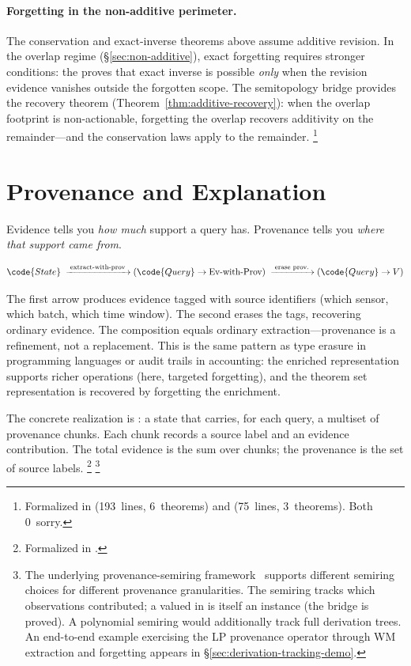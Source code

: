 \documentclass[11pt,openany]{report}
\begin{document}
\paragraph{Forgetting in the non-additive perimeter.}
The conservation and exact-inverse theorems above assume additive
revision.  In the overlap regime
(\S\ref{sec:non-additive}), exact forgetting requires stronger
conditions: the  proves that
exact inverse is possible \emph{only} when the revision evidence
vanishes outside the forgotten scope.  The semitopology bridge
provides the recovery theorem
(Theorem~\ref{thm:additive-recovery}): when the overlap footprint
is non-actionable, forgetting the overlap recovers additivity on
the remainder---and the conservation laws apply to the
remainder.%
\footnote{Formalized in
(193~lines, 6~theorems) and
(75~lines, 3~theorems).  Both 0~sorry.}


\section{Provenance and Explanation}
\label{sec:provenance}

Evidence tells you \emph{how much} support a query has.  Provenance
tells you \emph{where that support came from}.

\[
  \code{State}
  \;\xrightarrow{\;\text{extract-with-prov}\;}
  (\code{Query} \to \text{Ev-with-Prov})
  \;\xrightarrow{\;\text{erase prov.}\;}
  (\code{Query} \to V)
\]

\noindent
The first arrow produces evidence tagged with source identifiers
(which sensor, which batch, which time window).  The second erases
the tags, recovering ordinary evidence.  The composition equals
ordinary extraction---provenance is a refinement, not a replacement.
This is the same pattern as type erasure in programming languages or
audit trails in accounting: the enriched representation supports
richer operations (here, targeted forgetting), and the theorem set
representation is recovered by forgetting the enrichment.

The concrete realization is : a state that
carries, for each query, a multiset of provenance chunks.  Each chunk
records a source label and an evidence contribution.  The total
evidence is the sum over chunks; the provenance is the set of source
labels.%
\footnote{Formalized in
.}%
\footnote{The underlying provenance-semiring
framework~\cite{GreenKarvounarakisTannen2007} supports different
semiring choices for different provenance granularities.  The
 semiring tracks which observations contributed; a
 valued in  is itself an
 instance (the bridge is proved).  A
polynomial semiring would additionally track full derivation trees.
An end-to-end example exercising the LP provenance operator
 through WM extraction and forgetting
appears in \S\ref{sec:derivation-tracking-demo}.}
\end{document}
